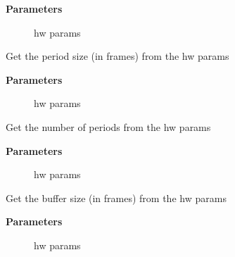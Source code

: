 \documentclass[a4paper,8pt,english]{sphinxmanual}
\begin{document}
\textbf{Parameters}
\begin{description}
\item[{}] \leavevmode
hw params

\end{description}

\begin{fulllineitems}
\label{sound/kernel-api/alsa-driver-api:c.params_period_size}
Get the period size (in frames) from the hw params

\end{fulllineitems}


\textbf{Parameters}
\begin{description}
\item[{}] \leavevmode
hw params

\end{description}

\begin{fulllineitems}
\label{sound/kernel-api/alsa-driver-api:c.params_periods}
Get the number of periods from the hw params

\end{fulllineitems}


\textbf{Parameters}
\begin{description}
\item[{}] \leavevmode
hw params

\end{description}

\begin{fulllineitems}
\label{sound/kernel-api/alsa-driver-api:c.params_buffer_size}
Get the buffer size (in frames) from the hw params

\end{fulllineitems}


\textbf{Parameters}
\begin{description}
\item[{}] \leavevmode
hw params

\end{description}
\end{document}
